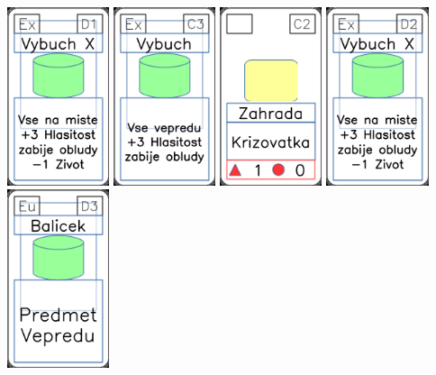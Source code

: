 \documentclass[a4paper]{article}
\begin{document}
	\includegraphics[width=3.0cm]{img-4_15}
	\includegraphics[width=3.0cm]{img-4_12}
	\includegraphics[width=3.0cm]{img-3_26}
	\includegraphics[width=3.0cm]{img-4_16}
	\includegraphics[width=3.0cm]{img-4_17}
\end{document}
